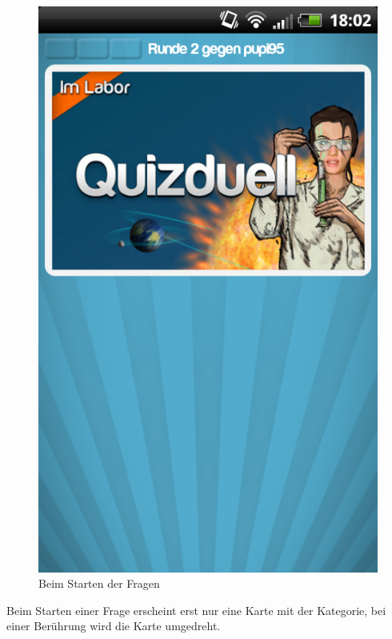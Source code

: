 \documentclass[fontsize=12pt,paper=a4,twoside]{scrartcl}
\begin{document}
\begin{figure}[H]
\centering
\includegraphics[scale=0.5]{Bilder/spielstart.png}
\caption{Beim Starten der Fragen}
\end{figure}

Beim Starten einer Frage erscheint erst nur eine Karte mit der Kategorie, bei einer Berührung wird die Karte umgedreht.\\
\end{document}
